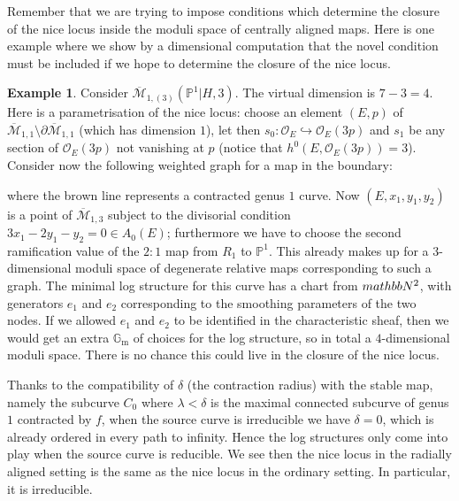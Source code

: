 \documentclass[11pt]{amsart}
\newcommand{\oM}{\overline{\mathcal{M}}}
\newcommand{\M}[4]{\overline{\mathcal{M}}_{#1,#2}(#3,#4)}
\newcommand{\PP}{\mathbb P}
\newcommand{\OO}{\mathcal{O}}
\newcommand{\Gm}{\mathbb{G}_{\text{m}}}
\theoremstyle{definition}
\theoremstyle{definition}
\newtheorem{example}[thm]{Example}
\begin{document}
Remember that we are trying to impose conditions which determine the closure of the nice locus inside the moduli space of centrally aligned maps. Here is one example where we show by a dimensional computation that the novel condition must be included if we hope to determine the closure of the nice locus.
\begin{example}
Consider $\M{1}{(3)}{\PP^1|H}{3}$. The virtual dimension is $7-3=4$. Here is a parametrisation of the nice locus: choose an element $(E,p)$ of $\oM_{1,1}\setminus\partial\oM_{1,1}$ (which has dimension $1$), let then $s_0\colon\OO_E\hookrightarrow\OO_E(3p)$ and $s_1$ be any section of $\OO_E(3p)$ not vanishing at $p$ (notice that $h^0(E,\OO_E(3p))=3$). Consider now the following weighted graph for a map in the boundary:
\begin{center}
\end{center}
where the brown line represents a contracted genus $1$ curve. Now $(E,x_1,y_1,y_2)$ is a point of $\oM_{1,3}$ subject to the divisorial condition $3x_1-2y_1-y_2=0\in A_0(E)$; furthermore we have to choose the second ramification value of the $2\colon 1$ map from $R_1$ to $\PP^1$. This already makes up for a $3$-dimensional moduli space of degenerate relative maps corresponding to such a graph. The minimal log structure for this curve has a chart from $\-mathbb N^2$, with generators $e_1$ and $e_2$ corresponding to the smoothing parameters of the two nodes. If we allowed $e_1$ and $e_2$ to be identified in the characteristic sheaf, then we would get an extra $\Gm$ of choices for the log structure, so in total a $4$-dimensional moduli space. There is no chance this could live in the closure of the nice locus.
\end{example}

Thanks to the compatibility of $\delta$ (the contraction radius) with the stable map, namely the subcurve $C_0$ where $\lambda<\delta$ is the maximal connected subcurve of genus $1$ contracted by $f$, when the source curve is irreducible we have $\delta=0$, which is already ordered in every path to infinity. Hence the log structures only come into play when the source curve is reducible. We see then the nice locus in the radially aligned setting is the same as the nice locus in the ordinary setting. In particular, it is irreducible.
\end{document}
